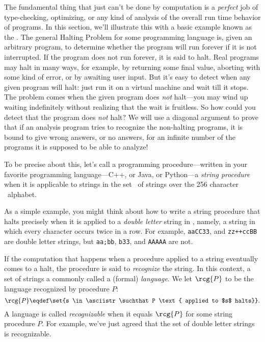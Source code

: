 The fundamental thing that just can't be done by
computation is a \emph{perfect} job of type-checking, optimizing, or
any kind of analysis of the overall run time behavior of programs.  In
this section, we'll illustrate this with a basic example known as the
.  The general Halting Problem for some
programming language is, given an arbitrary program, to determine whether
the program will run forever if it is not interrupted.  If the program
does not run forever, it is said to halt.  Real programs may
halt in many ways, for example, by returning some final value,
aborting with some kind of error, or by awaiting user input.  But it's
easy to detect when any given program will halt: just run it on a
virtual machine and wait till it stops.  The problem comes when the
given program does \emph{not} halt---you may wind up waiting
indefinitely without realizing that the wait is fruitless.  So how
could you detect that the program does \emph{not} halt?  We will use a
diagonal argument to prove that if an analysis program tries to
recognize the non-halting programs, it is bound to give wrong answers,
or no answers, for an infinite number of the programs it is supposed to be
able to analyze!

To be precise about this, let's call a programming procedure---written
in your favorite programming language---C++, or Java, or Python---a
\emph{string procedure} when it is applicable to strings in the set
\asciistr\ of strings over the 256 character \asciibet\ alphabet.

As a simple example, you might think about how to write a string
procedure that halts precisely when it is applied to a \emph{double
  letter} string in \asciistr, namely, a string in which every
character occurs twice in a row.  For example, \texttt{aaCC33}, and
\texttt{zz++ccBB} are double letter strings, but \texttt{aa;bb},
\texttt{b33}, and \texttt{AAAAA} are not.

If the computation that happens when a procedure applied to a string
eventually comes to a halt, the procedure is said to \emph{recognize}
the string.  In this context, a set of strings a commonly called a
(formal) \emph{language}.  We let $\rcg{P}$ to be the language
recognized by procedure $P$:
\[
\rcg{P} \eqdef \set{s \in \asciistr \suchthat P \text{ applied to $s$
  halts}}.
\]
A language is called \emph{recognizable} when it equals $\rcg{P}$ for
some string procedure $P$.  For example, we've just agreed that the
set of double letter strings is recognizable.

